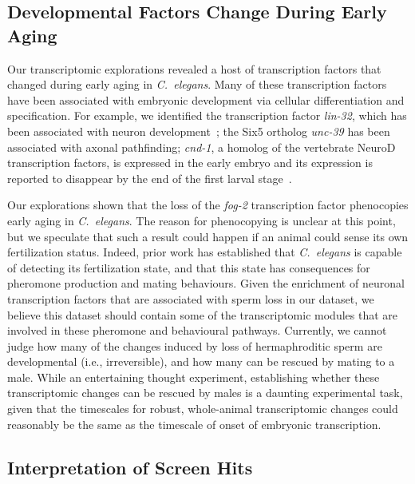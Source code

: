 \documentclass[9pt,twocolumn,twoside]{gsag3jnl}
\newcommand{\cel}{\emph{C.~elegans}}
\newcommand{\fog}{\emph{fog-2}}
\begin{document}
\subsection*{Developmental Factors Change During Early Aging}
\label{sub:development_in_aging}

Our transcriptomic explorations revealed a host of transcription factors that changed during early aging in \cel{}. Many of these transcription factors have been associated with embryonic development via cellular differentiation and specification. For example, we identified the transcription factor \emph{lin-32}, which has been associated with neuron development~\citep{}; the Six5 ortholog \emph{unc-39} has been associated with axonal pathfinding; \emph{cnd-1}, a homolog  of the vertebrate NeuroD transcription factors, is expressed in the early embryo and its expression is reported to disappear by the end of the first larval stage~\citep{}.

Our explorations shown that the loss of the \fog{} transcription factor phenocopies early aging in \cel{}. The reason for phenocopying is unclear at this point, but we speculate that such a result could happen if an animal could sense its own fertilization status. Indeed, prior work has established that \cel{} is capable of detecting its fertilization state, and that this state has consequences for pheromone production and mating behaviours.
Given the enrichment of neuronal transcription factors that are associated with sperm loss in our dataset, we believe this dataset should contain some of the transcriptomic modules that are involved in these pheromone and behavioural pathways. Currently, we cannot judge how many of the changes induced by loss of hermaphroditic sperm are developmental (i.e., irreversible), and how many can be rescued by mating to a male. While an entertaining thought experiment, establishing whether these transcriptomic changes can be rescued by males is a daunting experimental task, given that the timescales for robust, whole-animal transcriptomic changes could reasonably be the same as the timescale of onset of embryonic transcription.

\subsection*{Interpretation of Screen Hits}
\label{sub:Interpretation of Screen Hits}





% 
\end{document}
